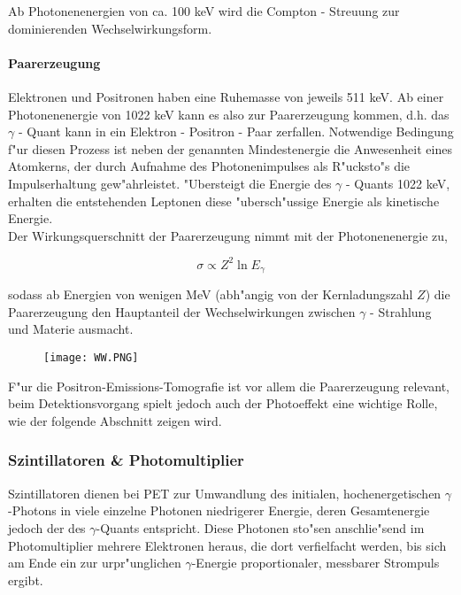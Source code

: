 \documentclass{article}
\begin{document}
Ab Photonenenergien von ca. 100 keV wird die Compton - Streuung zur dominierenden Wechselwirkungsform.


\paragraph{Paarerzeugung}

Elektronen und Positronen haben eine Ruhemasse von jeweils 511 keV. Ab einer Photonenenergie von 1022 keV kann es also zur Paarerzeugung kommen, d.h. das $\gamma$ - Quant kann in ein Elektron - Positron - Paar zerfallen. Notwendige Bedingung f"ur diesen Prozess ist neben der genannten Mindestenergie die Anwesenheit eines Atomkerns, der durch Aufnahme des Photonenimpulses als R"ucksto"s die Impulserhaltung gew"ahrleistet. "Ubersteigt die Energie des $\gamma$ - Quants 1022 keV, erhalten die entstehenden Leptonen diese "ubersch"ussige Energie als kinetische Energie.\\
Der Wirkungsquerschnitt der Paarerzeugung nimmt mit der Photonenenergie zu,

	\begin{equation}
		\sigma \propto Z^2 \ln{E_{\gamma}}
	\end{equation}

sodass ab Energien von wenigen MeV (abh"angig von der Kernladungszahl $Z$) die Paarerzeugung den Hauptanteil der Wechselwirkungen zwischen $\gamma$ - Strahlung und Materie ausmacht.


\begin{figure}[H]
	\centering
	\texttt{[image: WW.PNG]}
	\label{figWW}
\end{figure}

F"ur die Positron-Emissions-Tomografie ist vor allem die Paarerzeugung relevant, beim Detektionsvorgang spielt jedoch auch der Photoeffekt eine wichtige Rolle, wie der folgende Abschnitt zeigen wird.


\subsubsection{Szintillatoren \& Photomultiplier}

Szintillatoren dienen bei PET zur Umwandlung des initialen, hochenergetischen $\gamma$-Photons in viele einzelne Photonen niedrigerer Energie, deren Gesamtenergie jedoch der des $\gamma$-Quants entspricht. Diese Photonen sto"sen anschlie"send im Photomultiplier mehrere Elektronen heraus, die dort verfielfacht werden, bis sich am Ende ein zur urpr"unglichen $\gamma$-Energie proportionaler, messbarer Strompuls ergibt.
\end{document}
